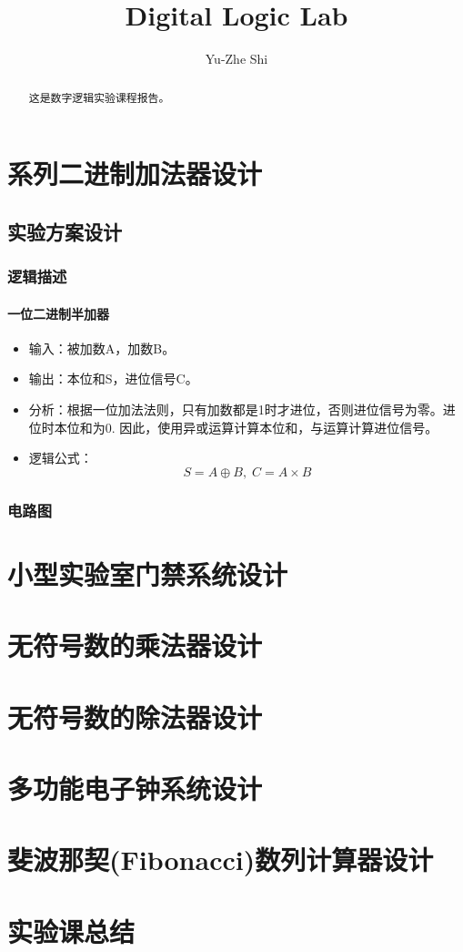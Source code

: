 \documentclass{ctexrep}
\title{Digital Logic Lab}
\author{Yu-Zhe Shi}
\begin{document}
\maketitle
\begin{abstract}
    这是数字逻辑实验课程报告。
\end{abstract}
\tableofcontents
\chapter{系列二进制加法器设计}
\section{实验方案设计}
\subsection{逻辑描述}
\subsubsection{一位二进制半加器}
\begin{itemize}
    \item 输入：被加数A，加数B。
    \item 输出：本位和S，进位信号C。
    \item 分析：根据一位加法法则，只有加数都是1时才进位，否则进位信号为零。进位时本位和为0. 因此，使用异或运算计算本位和，与运算计算进位信号。
    \item 逻辑公式：\begin{equation}
        S=A\oplus B,\;C=A\times B
    \end{equation}
\end{itemize}
\subsection{电路图}
\begin{figure}[h]
\end{figure}

\chapter{小型实验室门禁系统设计}


\chapter{无符号数的乘法器设计}


\chapter{无符号数的除法器设计}


\chapter{多功能电子钟系统设计}


\chapter{斐波那契(Fibonacci)数列计算器设计}


\chapter{实验课总结}
\end{document}
